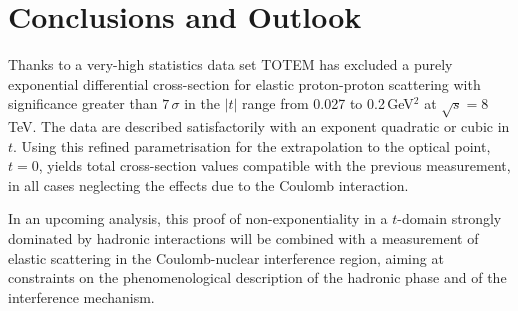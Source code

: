
\section{Conclusions and Outlook}
\label{sec:conclusions}
%
Thanks to a very-high statistics data set TOTEM has excluded a purely exponential differential 
cross-section for elastic proton-proton scattering with significance greater than $7\,\sigma$
in the $|t|$ range from 0.027 to 0.2\,GeV$^{2}$ at $\sqrt{s}=8\,$TeV. The data
are described satisfactorily with an exponent quadratic or cubic in $t$.
Using this refined parametrisation for the extrapolation to the optical point,
$t = 0$, yields total cross-section values compatible with the previous measurement, in all cases
neglecting the effects due to the Coulomb interaction.

In an upcoming analysis, this proof of non-exponentiality in a 
$t$-domain strongly
dominated by hadronic interactions will be combined with a measurement of 
elastic scattering in the Coulomb-nuclear interference region, aiming at 
constraints on the phenomenological description of the hadronic phase and of 
the interference mechanism.

